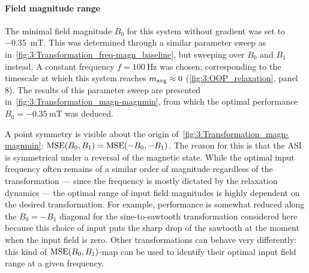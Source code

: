 \paragraph{Field magnitude range}
The minimal field magnitude $B_0$ for this system without gradient was set to \SI{-0.35}{\milli\tesla}.
This was determined through a similar parameter sweep as in~\cref{fig:3:Transformation_freq-magn_baseline}, but sweeping over $B_0$ and $B_1$ instead.
A constant frequency $f=\SI{100}{\hertz}$ was chosen, corresponding to the timescale at which this system reaches $m_\mathrm{avg} \approx 0$ (\cref{fig:3:OOP_relaxation}, panel 8).
The results of this parameter sweep are presented in~\cref{fig:3:Transformation_magn-magnmin}, from which the optimal performance $B_0=\SI{-0.35}{\milli\tesla}$ was deduced.

\vspace{-1em}

A point symmetry is visible about the origin of~\cref{fig:3:Transformation_magn-magnmin}: $\mathrm{MSE}(B_0, B_1) = \mathrm{MSE}(-B_0, -B_1)$.
The reason for this is that the ASI is symmetrical under a reversal of the magnetic state.
While the optimal input frequency often remains of a similar order of magnitude regardless of the transformation --- since the frequency is mostly dictated by the relaxation dynamics --- the optimal range of input field magnitudes is highly dependent on the desired transformation.
For example, performance is somewhat reduced along the $B_0 = -B_1$ diagonal for the sine-to-sawtooth transformation considered here because this choice of input puts the sharp drop of the sawtooth at the moment when the input field is zero.
Other transformations can behave very differently: this kind of $\mathrm{MSE}(B_0, B_1)$-map can be used to identify their optimal input field range at a given frequency.

